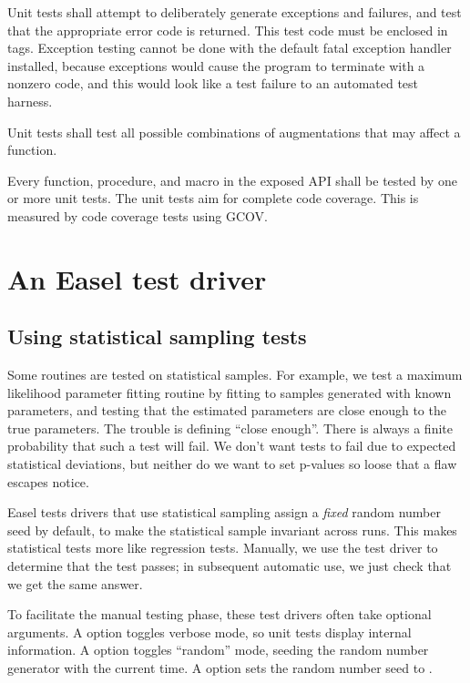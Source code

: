 Unit tests shall attempt to deliberately generate exceptions and
failures, and test that the appropriate error code is returned.  This
test code must be enclosed in  tags.
Exception testing cannot be done with the default fatal exception
handler installed, because exceptions would cause the program to
terminate with a nonzero code, and this would look like a test failure
to an automated test harness.

Unit tests shall test all possible combinations of augmentations that
may affect a function.

Every function, procedure, and macro in the exposed API shall be
tested by one or more unit tests. The unit tests aim for complete code
coverage. This is measured by code coverage tests using GCOV.


\section{An Easel test driver}


\subsection{Using statistical sampling tests}

Some routines are tested on statistical samples. For example, we test
a maximum likelihood parameter fitting routine by fitting to samples
generated with known parameters, and testing that the estimated
parameters are close enough to the true parameters.  The trouble is
defining ``close enough''. There is always a finite probability that
such a test will fail. We don't want tests to fail due to expected
statistical deviations, but neither do we want to set p-values so
loose that a flaw escapes notice.

Easel tests drivers that use statistical sampling assign a
\emph{fixed} random number seed by default, to make the statistical
sample invariant across runs. This makes statistical tests more like
regression tests. Manually, we use the test driver to determine that
the test passes; in subsequent automatic use, we just check that we
get the same answer.

To facilitate the manual testing phase, these test drivers often take
optional arguments. A  option toggles verbose mode, so unit
tests display internal information. A  option toggles
``random'' mode, seeding the random number generator with the current
time. A  option sets the random number seed to
.


